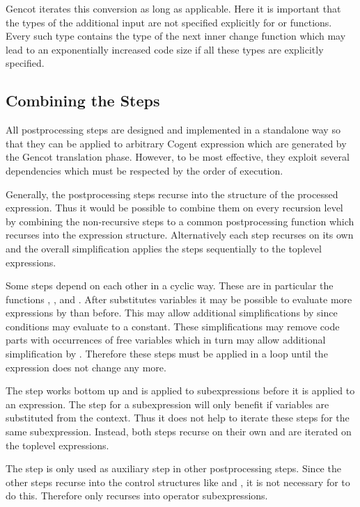 Gencot iterates this conversion as long as applicable. Here it is important that the types of the additional input
are not specified explicitly for  or  functions. Every such type contains the type of the next inner
change function which may lead to an exponentially increased code size if all these types are explicitly specified.

\subsection{Combining the Steps}
\label{impl-post-combine}

All postprocessing steps are designed and implemented in a standalone way so that they can be applied to arbitrary Cogent expression
which are generated by the Gencot translation phase. However, to be most effective, they exploit several dependencies which must
be respected by the order of execution.

Generally, the postprocessing steps recurse into the structure of the processed expression. Thus it would be possible to combine them
on every recursion level by combining the non-recursive steps to a common postprocessing function which recurses into the expression
structure. Alternatively each step recurses on its own and the overall simplification applies the steps sequentially to the toplevel
expressions.

Some steps depend on each other in a cyclic way. These are in particular the functions , , and .
After  substitutes variables it may be possible to evaluate more expressions by  than before. This may
allow additional simplifications by  since conditions may evaluate to a constant. These simplifications may remove code parts 
with occurrences of free variables which in turn may allow additional simplification by . Therefore these steps must 
be applied in a loop until the expression does not change any more.

The  step works bottom up and is applied to subexpressions before it is applied to an expression. The  step 
for a subexpression will only benefit if variables are substituted from the context. Thus it does not help to iterate these steps for
the same subexpression. Instead, both steps recurse on their own and are iterated on the toplevel expressions.

The  step is only used as auxiliary step in other postprocessing steps. Since the other steps recurse into the control
structures like  and , it is not necessary for  to do this. Therefore  only recurses
into operator subexpressions.

